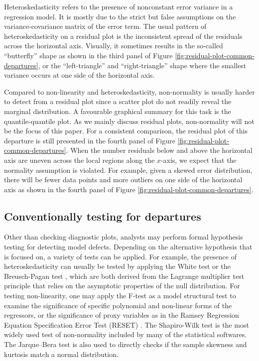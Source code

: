 \documentclass[]{interact}
\theoremstyle{plain}%
\theoremstyle{definition}
\theoremstyle{remark}
\begin{document}
Heteroskedasticity refers to the presence of nonconstant error variance
in a regression model. It is mostly due to the strict but false
assumptions on the variance-covariance matrix of the error term. The
usual pattern of heteroskedasticity on a residual plot is the
inconsistent spread of the residuals across the horizontal axis.
Visually, it sometimes results in the so-called ``butterfly'' shape as
shown in the third panel of Figure
\ref{fig:residual-plot-common-departures}, or the ``left-triangle'' and
``right-triangle'' shape where the smallest variance occurs at one side
of the horizontal axis.

Compared to non-linearity and heteroskedasticity, non-normality is
usually harder to detect from a residual plot since a scatter plot do
not readily reveal the marginal distribution. A favourable graphical
summary for this task is the quantile-quantile plot. As we mainly
discuss residual plots, non-normality will not be the focus of this
paper. For a consistent comparison, the residual plot of this departure
is still presented in the fourth panel of Figure
\ref{fig:residual-plot-common-departures}. When the number residuals
below and above the horizontal axis are uneven across the local regions
along the \(x\)-axis, we expect that the normality assumption is
violated. For example, given a skewed error distribution, there will be
fewer data points and more outliers on one side of the horizontal axis
as shown in the fourth panel of Figure
\ref{fig:residual-plot-common-departures}.

\hypertarget{conventionally-testing-for-departures}{%
\subsection{Conventionally testing for
departures}\label{conventionally-testing-for-departures}}

Other than checking diagnostic plots, analysts may perform formal
hypothesis testing for detecting model defects. Depending on the
alternative hypothesis that is focused on, a variety of tests can be
applied. For example, the presence of heteroskedasticity can usually be
tested by applying the White test
\citep{white_heteroskedasticity-consistent_1980} or the Breusch-Pagan
test \citep{breusch_simple_1979}, which are both derived from the
Lagrange multiplier test \citep{silvey1959lagrangian} principle that
relies on the asymptotic properties of the null distribution. For
testing non-linearity, one may apply the F-test as a model structural
test to examine the significance of specific polynomial and non-linear
forms of the regressors, or the significance of proxy variables as in
the Ramsey Regression Equation Specification Error Test (RESET)
\citep{ramsey_tests_1969}. The Shapiro-Wilk test
\citep{shapiro1965analysis} is the most widely used test of
non-normality included by many of the statistical softwares. The
Jarque--Bera test \citep{jarque1980efficient} is also used to directly
checks if the sample skewness and kurtosis match a normal distribution.
\end{document}
